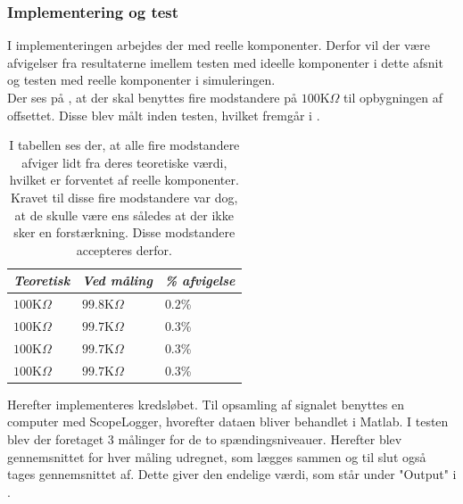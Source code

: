 \subsubsection{Implementering og test}
I implementeringen arbejdes der med reelle komponenter. Derfor vil der være afvigelser fra resultaterne imellem testen med ideelle komponenter i dette afsnit og testen med reelle komponenter i simuleringen. \\
Der ses på , at der skal benyttes fire modstandere på $100$K$\Omega$ til opbygningen af offsettet. Disse blev målt inden testen, hvilket fremgår i .
\begin{table}[H]
	\centering
	\begin{tabular}{|l|l|l|}
		\hline
		\textit{Teoretisk} & \textit{Ved måling} & \textit{\% afvigelse} \\ \hline
		$100$K$\Omega$       & $99.8$K$\Omega$       & $0.2$\%               \\ \hline
		$100$K$\Omega$       & $99.7$K$\Omega$       & $0.3$\%               \\ \hline
		$100$K$\Omega$       & $99.7$K$\Omega$       & $0.3$\%               \\ \hline
		$100$K$\Omega$       & $99.7$K$\Omega$       & $0.3$\%               \\ \hline
	\end{tabular}
	\caption{I tabellen ses der, at alle fire modstandere afviger lidt fra deres teoretiske værdi, hvilket er forventet af reelle komponenter. Kravet til disse fire modstandere var dog, at de skulle være ens således at der ikke sker en forstærkning. Disse modstandere accepteres derfor.}
	\label{Tab:modstand_offset}
\end{table}
\noindent Herefter implementeres kredsløbet. Til opsamling af signalet benyttes en computer med ScopeLogger, hvorefter dataen bliver behandlet i Matlab. I testen blev der foretaget 3 målinger for de to spændingsniveauer. Herefter blev gennemsnittet for hver måling udregnet, som lægges sammen og til slut også tages gennemsnittet af. Dette giver den endelige værdi, som står under "Output" i .
